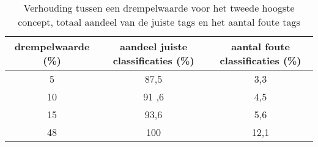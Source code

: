 \begin{table}
	\renewcommand\arraystretch{1.2}
	\centering
	\begin{tabular}{*{3}{c}}
		\toprule
		drempelwaarde (\%) & aandeel juiste classificaties (\%) & aantal foute classificaties (\%) \\
		\midrule
		5 & 87,5 & 3,3 \\
		[\smallskipamount]
		10 & 91 ,6& 4,5 \\
		[\smallskipamount]
		15 & 93,6 & 5,6 \\
		[\smallskipamount]
		48 & 100 & 12,1 \\
		\bottomrule
	\end{tabular}
	\caption{Verhouding tussen een drempelwaarde voor het tweede hoogste concept, totaal aandeel van de juiste tags en het aantal foute tags}
	\label{tab:drempelwaarde-custom-tag2}
\end{table}

